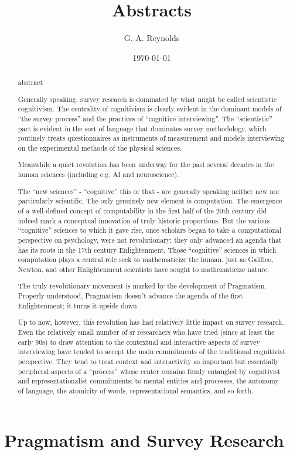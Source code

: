 \documentclass[11pt,twoside]{article}
\title{Abstracts}
\author{G. A. Reynolds}
\date{\today}
\newcommand{\SR}{Survey Research}
\newcommand{\sr}{survey research}
\begin{document}
\maketitle
\nocite{*}

\begin{abstract}
abstract
\end{abstract}

\tableofcontents
\listoffigures

\newpage
\section{Pragmatism and \SR{}}

\begin{abstract}
Generally speaking, \sr{} is dominated by what might be called
scientistic cognitivism.  The centrality of cognitivism is clearly
evident in the dominant models of ``the survey process'' and the
practices of ``cognitive interviewing''.  The ``scientistic'' part is
evident in the sort of language that dominates survey methodology,
which routinely treats questionnaires as instruments of measurement
and models interviewing on the experimental methods of the physical
sciences.

Meanwhile a quiet revolution has been underway for the past several
decades in the human sciences (including e.g. AI and neuroscience).

The ``new sciences'' - ``cognitive'' this or that - are generally
speaking neither new nor particularly scientific.  The only genuinely
new element is computation.  The emergence of a well-defined concept
of computability in the first half of the 20th century did indeed mark
a conceptual innovation of truly historic proportions.  But the
various ``cognitive'' sciences to which it gave rise, once scholars
began to take a computational perspective on psychology, were not
revolutionary; they only advanced an agenda that has its roots in the
17th century Enlightenment.  Those ``cognitive'' sciences in which
computation plays a central role seek to mathematicize the human, just
as Galilleo, Newton, and other Enlightenment scientists have sought to
mathematicize nature.

The truly revolutionary movement is marked by the development of
Pragmatism.  Properly understood, Pragmatism doesn't advance the
agenda of the first Enlightenment; it turns it upside down.

Up to now, however, this revolution has had relatively little impact
on \sr{}.  Even the relatively small number of sr{} researchers who
have tried (since at least the early 90s) to draw attention to the
contextual and interactive aspects of survey interviewing have tended
to accept the main commitments of the traditional cognitivist
perspective.  They tend to treat context and interactivity as
important but essentially peripheral aspects of a ``process'' whose
center remains firmly entangled by cognitivist and representationalist
commitments: to mental entities and processes, the autonomy of
language, the atomicity of words, representational semantics, and so
forth.


\end{abstract}
\end{document}
